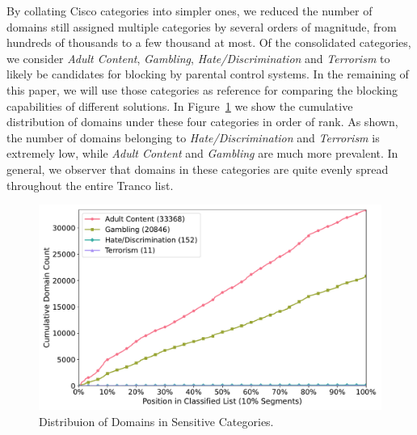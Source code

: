 By collating Cisco categories into simpler ones, we reduced the number of domains still assigned
multiple categories by several orders of magnitude, from hundreds
of thousands to a few thousand at most.
Of the consolidated categories, we consider \emph{Adult Content},
\emph{Gambling}, \emph{Hate/Discrimination} and \emph{Terrorism} to likely be
candidates for blocking by parental control systems. In the remaining of this paper, we will use those categories as reference for comparing the blocking capabilities of different solutions.
In Figure~\ref{fig:blockedcategories} we show the cumulative distribution of
domains under these four categories in order of rank.
As shown, the number of domains belonging
to \emph{Hate/Discrimination} and \emph{Terrorism} is extremely low, while
\emph{Adult Content} and \emph{Gambling} are much more prevalent. In general, we observer that domains in these categories are quite evenly spread throughout the entire Tranco list.

\begin{figure}[!t]
    \centering
    \includegraphics[width=0.95\columnwidth]{Images/cumulative_blocked_categories.pdf}
    \caption{Distribuion of Domains in Sensitive Categories.}
    \label{fig:blockedcategories}
\end{figure}

